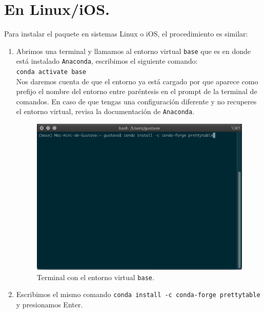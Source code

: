 \documentclass[11pt]{article}
\newcommand{\letraconsola}[1]{\texttt{#1}}
\begin{document}
\section{En Linux/iOS.}
Para instalar el paquete en sistemas Linux o iOS, el procedimiento es similar:
\begin{enumerate}
\item Abrimos una terminal y llamamos al entorno virtual \letraconsola{base} que es en donde está instalado \letraconsola{Anaconda}, escribimos el siguiente comando:
\\
\medskip
\verb|conda activate base|
\\
\medskip
Nos daremos cuenta de que el entorno ya está cargado por que aparece como prefijo el nombre del entorno entre paréntesis en el prompt de la terminal de comandos. En caso de que tengas una configuración diferente y no recuperes el entorno virtual, revisa la documentación de \letraconsola{Anaconda}.
\begin{figure}[H]
    \centering
    \includegraphics[scale=0.5]{Imagenes/instalacion_paquete_python_05.png}
    \caption{Terminal con el entorno virtual \letraconsola{base}.}
    \label{fig:figura_05}
\end{figure}
\item Escribimos el mismo comando \verb|conda install -c conda-forge prettytable| y presionamos Enter.
\begin{figure}[H]
    \centering

\end{figure}
\end{enumerate}
\end{document}
